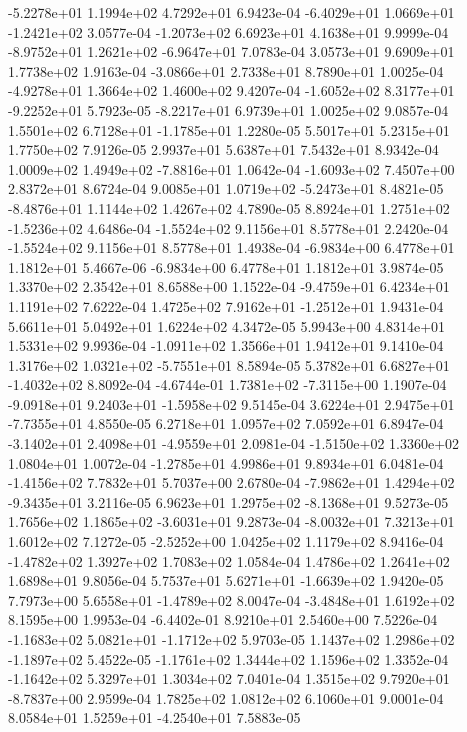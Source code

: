 -5.2278e+01  1.1994e+02  4.7292e+01  6.9423e-04
-6.4029e+01  1.0669e+01 -1.2421e+02  3.0577e-04
-1.2073e+02  6.6923e+01  4.1638e+01  9.9999e-04
-8.9752e+01  1.2621e+02 -6.9647e+01  7.0783e-04
3.0573e+01 9.6909e+01 1.7738e+02  1.9163e-04
-3.0866e+01  2.7338e+01  8.7890e+01  1.0025e-04
-4.9278e+01  1.3664e+02  1.4600e+02  9.4207e-04
-1.6052e+02  8.3177e+01 -9.2252e+01  5.7923e-05
-8.2217e+01  6.9739e+01  1.0025e+02  9.0857e-04
 1.5501e+02  6.7128e+01 -1.1785e+01  1.2280e-05
5.5017e+01 5.2315e+01 1.7750e+02  7.9126e-05
2.9937e+01 5.6387e+01 7.5432e+01  8.9342e-04
 1.0009e+02  1.4949e+02 -7.8816e+01  1.0642e-04
-1.6093e+02  7.4507e+00  2.8372e+01  8.6724e-04
 9.0085e+01  1.0719e+02 -5.2473e+01  8.4821e-05
-8.4876e+01  1.1144e+02  1.4267e+02  4.7890e-05
 8.8924e+01  1.2751e+02 -1.5236e+02  4.6486e-04
-1.5524e+02  9.1156e+01  8.5778e+01  2.2420e-04
-1.5524e+02  9.1156e+01  8.5778e+01  1.4938e-04
-6.9834e+00  6.4778e+01  1.1812e+01  5.4667e-06
-6.9834e+00  6.4778e+01  1.1812e+01  3.9874e-05
1.3370e+02 2.3542e+01 8.6588e+00  1.1522e-04
-9.4759e+01  6.4234e+01  1.1191e+02  7.6222e-04
 1.4725e+02  7.9162e+01 -1.2512e+01  1.9431e-04
5.6611e+01 5.0492e+01 1.6224e+02  4.3472e-05
5.9943e+00 4.8314e+01 1.5331e+02  9.9936e-04
-1.0911e+02  1.3566e+01  1.9412e+01  9.1410e-04
 1.3176e+02  1.0321e+02 -5.7551e+01  8.5894e-05
 5.3782e+01  6.6827e+01 -1.4032e+02  8.8092e-04
-4.6744e-01  1.7381e+02 -7.3115e+00  1.1907e-04
-9.0918e+01  9.2403e+01 -1.5958e+02  9.5145e-04
 3.6224e+01  2.9475e+01 -7.7355e+01  4.8550e-05
6.2718e+01 1.0957e+02 7.0592e+01  6.8947e-04
-3.1402e+01  2.4098e+01 -4.9559e+01  2.0981e-04
-1.5150e+02  1.3360e+02  1.0804e+01  1.0072e-04
-1.2785e+01  4.9986e+01  9.8934e+01  6.0481e-04
-1.4156e+02  7.7832e+01  5.7037e+00  2.6780e-04
-7.9862e+01  1.4294e+02 -9.3435e+01  3.2116e-05
 6.9623e+01  1.2975e+02 -8.1368e+01  9.5273e-05
 1.7656e+02  1.1865e+02 -3.6031e+01  9.2873e-04
-8.0032e+01  7.3213e+01  1.6012e+02  7.1272e-05
-2.5252e+00  1.0425e+02  1.1179e+02  8.9416e-04
-1.4782e+02  1.3927e+02  1.7083e+02  1.0584e-04
1.4786e+02 1.2641e+02 1.6898e+01  9.8056e-04
 5.7537e+01  5.6271e+01 -1.6639e+02  1.9420e-05
 7.7973e+00  5.6558e+01 -1.4789e+02  8.0047e-04
-3.4848e+01  1.6192e+02  8.1595e+00  1.9953e-04
-6.4402e-01  8.9210e+01  2.5460e+00  7.5226e-04
-1.1683e+02  5.0821e+01 -1.1712e+02  5.9703e-05
 1.1437e+02  1.2986e+02 -1.1897e+02  5.4522e-05
-1.1761e+02  1.3444e+02  1.1596e+02  1.3352e-04
-1.1642e+02  5.3297e+01  1.3034e+02  7.0401e-04
 1.3515e+02  9.7920e+01 -8.7837e+00  2.9599e-04
1.7825e+02 1.0812e+02 6.1060e+01  9.0001e-04
 8.0584e+01  1.5259e+01 -4.2540e+01  7.5883e-05
